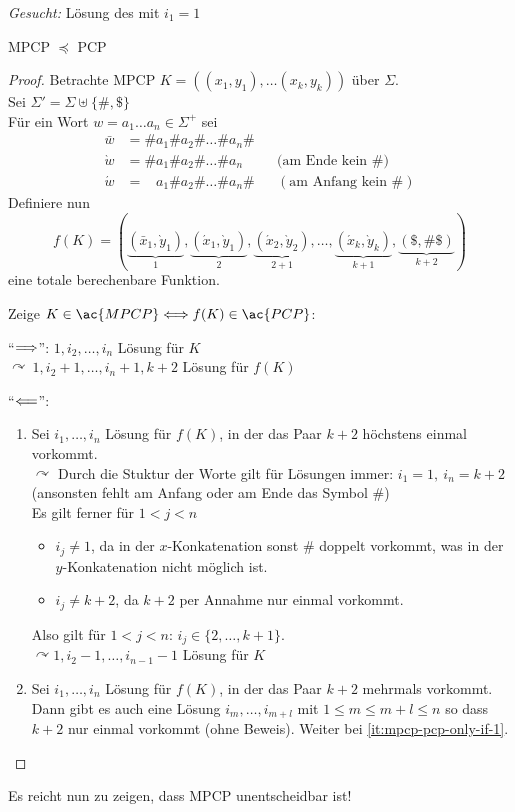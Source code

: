 \emph{Gesucht:} Lösung des  mit $i_1=1$
\begin{lemma}[name={[MPCP $\preceq$ PCP]}]
    \ac{MPCP} $\preceq$ \ac{PCP}
\end{lemma}
\begin{proof}
	Betrachte \ac{MPCP} $K=((x_1,y_1),\dots(x_k,y_k))$ über $\Sigma$.\\
	Sei $\Sigma'=\Sigma\uplus\{\#,\$\}$ \\
	Für ein Wort $w=a_1\dots a_n\in\Sigma^+$ sei
	\begin{align*}
		\bar w &= \#a_1\#a_2\#\dots\#a_n\#\\
		\grave w &= \#a_1\#a_2\#\dots\#a_n &&\text{(am Ende kein \#)}\\
		\acute w &= \phantom{\#}a_1\#a_2\#\dots\#a_n\# &&(\text{am Anfang kein }\#)
	\end{align*}
	Definiere nun
	\[ f(K) = (\underbrace{(\bar x_1,\grave y_1)}_1, \underbrace{(\acute x_1, \grave y_1)}_2, \underbrace{(\acute x_2,\grave y_2)}_{2+1}, \dots, \underbrace{(\acute x_k,\grave y_k)}_{k+1}, \underbrace{(\$,\#\$)}_{k+2}) \]
	eine totale berechenbare Funktion.
	
	Zeige $K \in \ac{MPCP} \<==> f(K) \in \ac{PCP}$:
	
	"`$\==>$"': $1, i_2, \dots, i_n$ Lösung für $K$\\
	$\curvearrowright\ 1, i_{2}+1, \dots, i_{n}+1, k+2$ Lösung für $f(K)$
	
	"`$\<==$"':
  \begin{enumerate}
  \item \label{it:mpcp-pcp-only-if-1} Sei $i_1, \dots, i_n$ Lösung für $f(K)$, in der das Paar $k+2$ höchstens einmal vorkommt.\\
  $\curvearrowright$  Durch die Stuktur der Worte gilt für Lösungen immer: $ i_1=1,\ i_n=k+2 $ (ansonsten fehlt am Anfang oder am Ende das Symbol $\#$)\\
  Es gilt ferner für $1 < j < n$
  \begin{itemize}
  \item $i_j \neq 1$, da in der $x$-Konkatenation sonst $\#$ doppelt vorkommt, was in der $y$-Konkatenation nicht möglich ist.
  \item $i_j \neq k+2$, da $k+2$ per Annahme nur einmal vorkommt.
  \end{itemize}
  Also gilt für $1 < j < n$: $i_j \in \{2, \dots, k+1\}$.\\
	$\curvearrowright 1, i_{2}-1, \dots, i_{n-1}-1$ Lösung für $K$
\item Sei $i_1, \dots, i_n$ Lösung für $f(K)$, in der das Paar $k+2$ mehrmals vorkommt.
  Dann gibt es auch eine Lösung $i_m,\dots,i_{m+l}$ mit $1 \le m \le m+l \le n$ so dass $k+2$ nur einmal vorkommt (ohne Beweis).
  Weiter bei \ref{it:mpcp-pcp-only-if-1}.
  \end{enumerate}

\end{proof}
Es reicht nun zu zeigen, dass \ac{MPCP} unentscheidbar ist!

